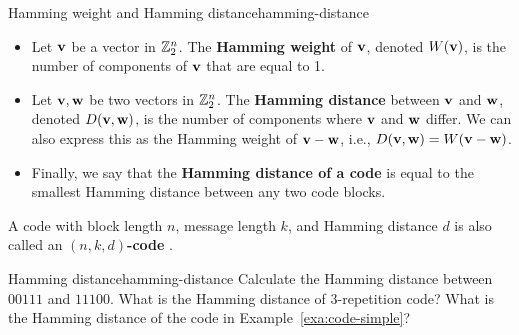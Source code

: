 \begin{definition}{Hamming weight and Hamming distance}{hamming-distance}
  \begin{itemize}
  \item Let $\vect{v}$ be a vector in $\mathbb{Z}_2^n$. The \textbf{Hamming
      weight}%
     of\/ $\vect{v}$,
    denoted $\Hw(\vect{v})$, is the number of components of\/ $\vect{v}$
    that are equal to 1.
  \item Let $\vect{v},\vect{w}$ be two vectors in $\mathbb{Z}_2^n$. The
    \textbf{Hamming distance}%
     between $\vect{v}$
    and $\vect{w}$, denoted $\Hd(\vect{v},\vect{w})$, is the number of
    components where $\vect{v}$ and $\vect{w}$ differ. We can also
    express this as the Hamming weight of\/ $\vect{v}-\vect{w}$, i.e.,
    $\Hd(\vect{v},\vect{w})=\Hw(\vect{v}-\vect{w})$.
  \item Finally, we say that the \textbf{Hamming distance of a code}
    is equal to the smallest Hamming distance between any two code
    blocks.
  \end{itemize}
  A code with block length $n$, message length $k$, and Hamming
  distance $d$ is also called an \textbf{$(n,k,d)$-code}%
  .
\end{definition}

\begin{example}{Hamming distance}{hamming-distance}
  Calculate the Hamming distance between $00111$ and $11100$. What is
  the Hamming distance of 3-repetition code? What is the
  Hamming distance of the code in Example~\ref{exa:code-simple}?
\end{example}

